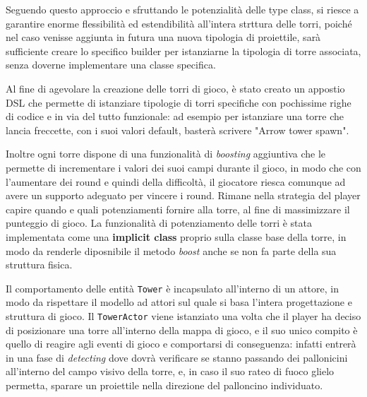 

Seguendo questo approccio e sfruttando le potenzialità delle type class, si riesce a garantire enorme flessibilità ed
estendibilità all'intera strttura delle torri, poiché nel caso venisse aggiunta in futura una nuova tipologia di
proiettile, sarà sufficiente creare lo specifico builder per istanziarne la tipologia di torre associata, senza
doverne implementare una classe specifica.

Al fine di agevolare la creazione delle torri di gioco, è stato creato un appostio DSL che permette di istanziare
tipologie di torri specifiche con pochissime righe di codice e in via del tutto funzionale: ad esempio per istanziare
una torre che lancia freccette, con i suoi valori default, basterà scrivere "Arrow tower spawn".



Inoltre ogni torre dispone di una funzionalità di \textit{boosting} aggiuntiva che le permette di incrementare i valori
dei suoi campi durante il gioco, in modo che con l'aumentare dei round e quindi della difficoltà, il giocatore riesca
comunque ad avere un supporto adeguato per vincere i round. Rimane nella strategia del player capire quando e quali
potenziamenti fornire alla torre, al fine di massimizzare il punteggio di gioco. La funzionalità di potenziamento
delle torri è stata implementata come una \textbf{implicit class} proprio sulla classe base della torre, in modo da
renderle diposnibile il metodo \textit{boost} anche se non fa parte della sua struttura fisica.

Il comportamento delle entità \texttt{Tower} è incapsulato all'interno di un attore, in modo da rispettare il modello
ad attori sul quale si basa l'intera progettazione e struttura di gioco. Il \texttt{TowerActor} viene istanziato una
volta che il player ha deciso di posizionare una torre all'interno della mappa di gioco, e il suo unico compito è
quello di reagire agli eventi di gioco e comportarsi di conseguenza: infatti entrerà in una fase di
\textit{detecting} dove dovrà verificare se stanno passando dei pallonicini all'interno del campo visivo della torre,
e, in caso il suo rateo di fuoco glielo permetta, sparare un proiettile nella direzione del palloncino individuato.

